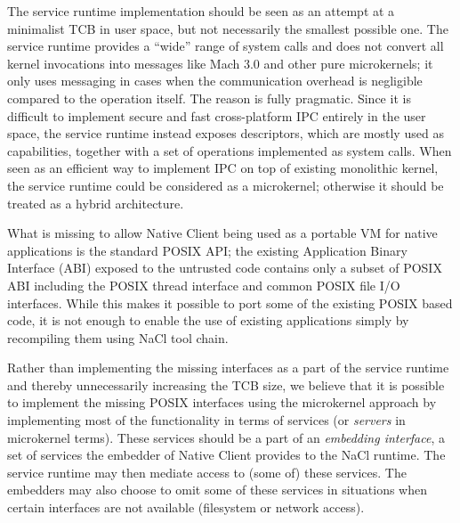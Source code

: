 The service runtime implementation  should be seen as an attempt at a
minimalist TCB in user space, but not necessarily the smallest possible
one. The service runtime provides a ``wide'' range of system calls and
does not convert all kernel invocations into messages like Mach 3.0 and
other pure microkernels; it only uses messaging in cases when the
communication overhead is negligible compared to the operation itself.
The reason is fully pragmatic. Since it is difficult to implement secure
and fast cross-platform IPC entirely in the user space, the service
runtime instead exposes descriptors, which are mostly used as
capabilities, together with a set of operations implemented as system
calls. When seen as an efficient way to implement IPC on top of existing
monolithic kernel, the service runtime could be considered as a
microkernel; otherwise it should be treated as a hybrid architecture.


What is missing to allow Native Client being used as a portable VM for
native applications is the standard POSIX API; the existing Application
Binary Interface (ABI) exposed to the untrusted code contains only a
subset of POSIX ABI including the POSIX thread interface and common
POSIX file I/O interfaces. While this makes it possible to port some of
the existing POSIX based code, it is not enough to enable the use of
existing applications simply by recompiling them using NaCl tool chain.

Rather than implementing the missing interfaces as a part of the service
runtime and thereby unnecessarily increasing the TCB size, we believe
that it is possible to implement the missing POSIX interfaces using the
microkernel approach by implementing most of the functionality in terms of
services (or \emph{servers} in microkernel terms).  These services
should be a part of an \emph{embedding interface}, a set of services the
embedder of Native Client provides to the NaCl runtime. The service
runtime may then mediate access to (some of) these services. The
embedders may also choose to  omit some of these services in situations
when certain interfaces are not available (\eg filesystem or network
access).

